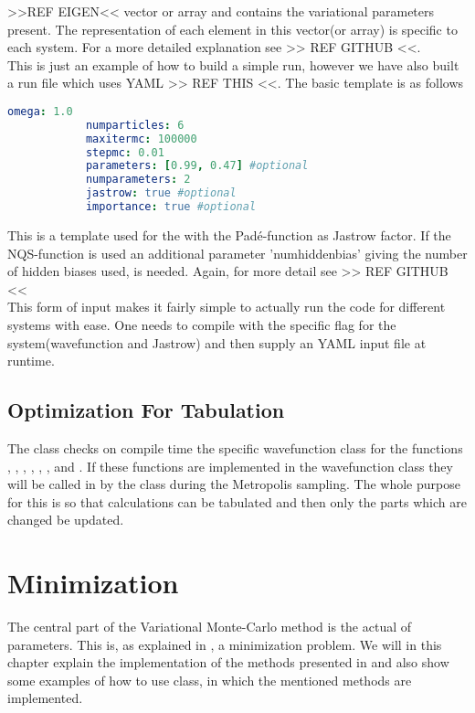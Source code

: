      >>REF EIGEN<< vector or array and contains the variational
    parameters present. The representation of each element in this vector(or
    array) is specific to each system. For a more detailed explanation see >>
    REF GITHUB <<. \\
    This is just an example of how to build a simple run, however we have also
    built a run file which uses YAML >> REF THIS <<. The basic template is as
    follows
        \begin{lstlisting}[language=yaml]
            omega: 1.0
            numparticles: 6
            maxitermc: 100000
            stepmc: 0.01
            parameters: [0.99, 0.47] #optional
            numparameters: 2
            jastrow: true #optional
            importance: true #optional
        \end{lstlisting}
    This is a template used for the  with the
    Pad\'e-function as Jastrow factor. If the NQS-function is used an
    additional parameter 'numhiddenbias' giving the number of hidden biases
    used, is needed. Again, for more detail see >> REF GITHUB << \\ 
    This form of input makes it fairly simple to actually run the code for
    different systems with ease. One needs to compile with the specific flag
    for the system(wavefunction and Jastrow) and then supply an YAML input file
    at runtime.

\subsection{Optimization For Tabulation}
    The  class checks on compile time the specific
    wavefunction class for the functions , ,
    , , ,
    ,  and
    . If these functions are implemented in the
    wavefunction class they will be called in by the  class
    during the Metropolis sampling. The whole purpose for this is so that
    calculations can be tabulated and then only the parts which are changed be
    updated.

\section{Minimization}
    The central part of the Variational Monte-Carlo method is the actual
     of parameters. This is, as explained in ,
    a minimization problem. We will in this chapter explain the implementation
    of the methods presented in  and also show some examples of
    how to use  class, in which the mentioned methods are
    implemented.

